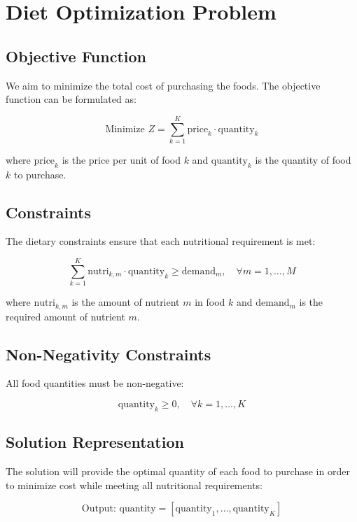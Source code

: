 \documentclass{article}
\begin{document}
\section*{Diet Optimization Problem}

\subsection*{Objective Function}
We aim to minimize the total cost of purchasing the foods. The objective function can be formulated as:

\[
\text{Minimize } Z = \sum_{k=1}^{K} \text{price}_k \cdot \text{quantity}_k
\]

where \(\text{price}_k\) is the price per unit of food \(k\) and \(\text{quantity}_k\) is the quantity of food \(k\) to purchase.

\subsection*{Constraints}
The dietary constraints ensure that each nutritional requirement is met:

\[
\sum_{k=1}^{K} \text{nutri}_{k, m} \cdot \text{quantity}_k \geq \text{demand}_m, \quad \forall m = 1, \ldots, M
\]

where \(\text{nutri}_{k, m}\) is the amount of nutrient \(m\) in food \(k\) and \(\text{demand}_m\) is the required amount of nutrient \(m\).

\subsection*{Non-Negativity Constraints}
All food quantities must be non-negative:

\[
\text{quantity}_k \geq 0, \quad \forall k = 1, \ldots, K
\]

\subsection*{Solution Representation}
The solution will provide the optimal quantity of each food to purchase in order to minimize cost while meeting all nutritional requirements:

\[
\text{Output: } \text{quantity} = [\text{quantity}_1, \ldots, \text{quantity}_K]
\]
\end{document}
